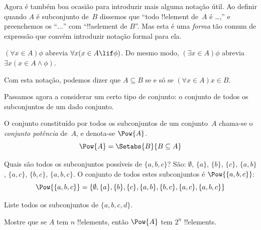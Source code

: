\documentclass[../../../include/open-logic-section]{subfiles}
\begin{document}
Agora é também boa ocasião para introduzir mais alguma
notação útil. Ao definir quando $A$ é subconjunto de~$B$ dissemos que
``todo !!{element} de~$A$ é \dots,'' e preenchemos os ``$\dots$'' com
``!!a{element} de $B$''. Mas esta é uma \emph{forma} tão comum de
expressão que convém introduzir notação formal para ela.

\begin{defn}
$(\forall x \in A)\phi$ abrevia $\forall x(x \in A \lif
\phi)$. Do mesmo modo, $(\exists x \in A)\phi$ abrevia $\exists x(x
\in A \land \phi)$. 
\end{defn}

Com esta notação, podemos dizer que $A \subseteq B$ se e só se $(\forall
x \in A)x \in B$. 

Passamos agora a considerar um certo tipo de conjunto: o conjunto de todos os
subconjuntos de um dado conjunto. 

\begin{defn}
O conjunto constituído por todos os subconjuntos de um conjunto~$A$ chama-se o
\emph{conjunto potência} de~$A$, e denota-se $\Pow{A}$.
  \[
    \Pow{A} = \Setabs{B}{B \subseteq A} 
  \]
\end{defn}

\begin{ex}
Quais são todos os subconjuntos possíveis de $\{ a, b, c \}$? São:
$\emptyset$, $\{a \}$, $\{b\}$, $\{c\}$, $\{a, b\}$, $\{a, c\}$, $\{b,
c\}$, $\{a, b, c\}$. O conjunto de todos estes subconjuntos é
$\Pow{\{a,b,c\}}$:
\[
\Pow{\{ a, b, c \}} = \{\emptyset, \{a \}, \{b\}, \{c\}, \{a, b\},
\{b, c\}, \{a, c\}, \{a, b, c\}\}
\]
\end{ex}

\begin{prob}
Liste todos os subconjuntos de $\{a, b, c, d\}$.
\end{prob}

\begin{prob}
Mostre que se $A$ tem $n$ !!{element}s, então $\Pow{A}$ tem $2^n$
!!{element}s.
\end{prob}
\end{document}
